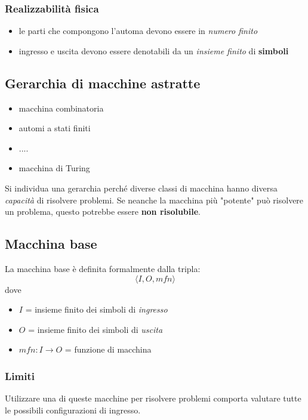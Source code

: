 \subsubsection{Realizzabilità fisica}
\begin{itemize}
    \item le parti che compongono l'automa devono essere in \textit{numero finito}
    \item ingresso e uscita devono essere denotabili da un \textit{insieme finito} di \textbf{simboli}
\end{itemize}

\subsection{Gerarchia di macchine astratte}
\begin{itemize}
    \item macchina combinatoria
    \item automi a stati finiti
    \item ....
    \item macchina di Turing
\end{itemize}

Si individua una gerarchia perché diverse classi di macchina hanno diversa \textit{capacità} di risolvere problemi. Se neanche la macchina più "potente" può risolvere un problema, questo potrebbe essere \textbf{non risolubile}.

\subsection{Macchina base}
La macchina base è definita formalmente dalla tripla:
\begin{equation*}
    \langle I, O, mfn\rangle
\end{equation*}
dove
\begin{itemize}
    \item $I$ = insieme finito dei simboli di \textit{ingresso}
    \item $O$ = insieme finito dei simboli di \textit{uscita}
    \item $mfn: I \rightarrow O$ = funzione di macchina
\end{itemize}

\subsubsection{Limiti}
Utilizzare una di queste macchine per risolvere problemi comporta valutare tutte le possibili configurazioni di ingresso.

